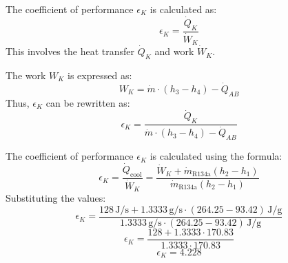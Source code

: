 The coefficient of performance \( \epsilon_K \) is calculated as:  
\[
\epsilon_K = \frac{\dot{Q}_K}{\dot{W}_K}
\]  
This involves the heat transfer \( \dot{Q}_K \) and work \( \dot{W}_K \).  

The work \( W_K \) is expressed as:  
\[
W_K = \dot{m} \cdot \left( h_3 - h_4 \right) - \dot{Q}_{AB}
\]  
Thus, \( \epsilon_K \) can be rewritten as:  
\[
\epsilon_K = \frac{\dot{Q}_K}{\dot{m} \cdot \left( h_3 - h_4 \right) - \dot{Q}_{AB}}
\]

The coefficient of performance \( \epsilon_K \) is calculated using the formula:  
\[
\epsilon_K = \frac{\dot{Q}_{\text{cool}}}{\dot{W}_K} = \frac{\dot{W}_K + \dot{m}_{\text{R134a}} (h_{2} - h_{1})}{\dot{m}_{\text{R134a}} (h_{2} - h_{1})}
\]  
Substituting the values:  
\[
\epsilon_K = \frac{128 \, \text{J/s} + 1.3333 \, \text{g/s} \cdot (264.25 - 93.42) \, \text{J/g}}{1.3333 \, \text{g/s} \cdot (264.25 - 93.42) \, \text{J/g}}
\]  
\[
\epsilon_K = \frac{128 + 1.3333 \cdot 170.83}{1.3333 \cdot 170.83}
\]  
\[
\epsilon_K = 4.228
\]